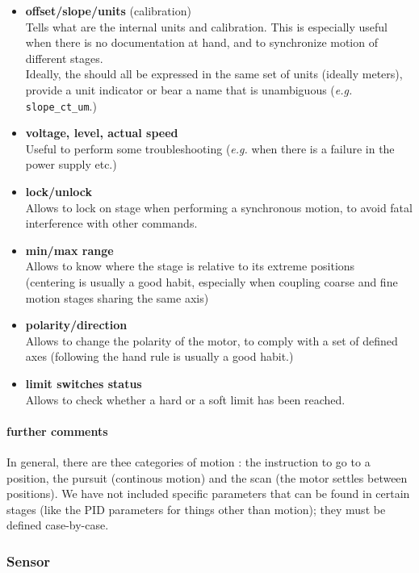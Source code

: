 \documentclass[10pt,letter,twoside]{report}
\begin{document}
\begin{itemize}
			\item \textbf{offset/slope/units} (calibration)\\
			Tells what are the internal units and calibration. This is especially useful when there is no documentation at hand, 
			and to synchronize motion of different stages.\\
			Ideally, the should all be expressed in the same set of units (ideally meters), 
			provide a unit indicator or bear a name that is unambiguous (\textit{e.g.} \verb!slope_ct_um!.)\\
			
	
			\item \textbf{voltage, level, actual speed}\\
			Useful to perform some troubleshooting (\textit{e.g.} when there is a failure in the power supply etc.)
			\item \textbf{lock/unlock}\\
			Allows to lock on stage when performing a synchronous motion, to avoid fatal interference with other commands.
			\item \textbf{min/max range}\\
			Allows to know where the stage is relative to its extreme positions\\
			(centering is usually a good habit, especially when coupling coarse and fine motion stages sharing the same axis)
			\item \textbf{polarity/direction}\\
			Allows to change the polarity of the motor, to comply with a set of defined axes (following the hand rule is usually a good habit.)
			\item \textbf{limit switches status}\\
			Allows to check whether a hard or a soft limit has been reached.
			\end{itemize}			
			
			\paragraph{further comments}
			In general, there are thee categories of motion : the instruction to go to a position, the pursuit (continous motion) and the scan 
			(the motor settles between positions). 
			We have not included specific parameters that can be found in certain stages (like the PID parameters for things other than motion); 
			they must be defined  case-by-case.
		
			\subsubsection{Sensor}
\end{document}
